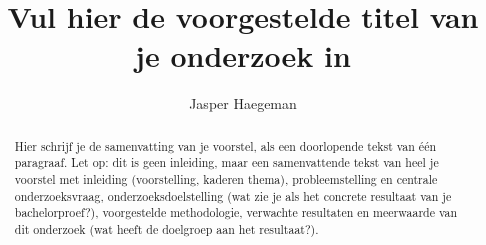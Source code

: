 \documentclass{hogent-article}
\title{Vul hier de voorgestelde titel van je onderzoek in}
\author{Jasper Haegeman}
\begin{document}
\begin{abstract}
  Hier schrijf je de samenvatting van je voorstel, als een doorlopende tekst van één paragraaf. Let op: dit is geen inleiding, maar een samenvattende tekst van heel je voorstel met inleiding (voorstelling, kaderen thema), probleemstelling en centrale onderzoeksvraag, onderzoeksdoelstelling (wat zie je als het concrete resultaat van je bachelorproef?), voorgestelde methodologie, verwachte resultaten en meerwaarde van dit onderzoek (wat heeft de doelgroep aan het resultaat?).
\end{abstract}

\tableofcontents



\printbibliography[heading=bibintoc]
\end{document}

